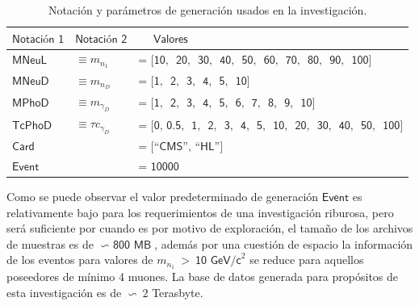\begin{table}[!h]
\centering
\begin{tabular}{|lll|}
\hline
$\textsf{Notación 1}$  & $\textsf{Notación 2}$  & $\textsf{~~~~Valores}$\\
\hline
$\textsf{MNeuL}$    & $\equiv m_{n_1}$  & $\textsf{= [10, ~20, ~30, ~40, ~50, ~60, ~70, ~80, ~90, ~100]}$\\
$\textsf{MNeuD}$    & $\equiv m_{n_D}$  & $\textsf{= [1, ~2, ~3, ~4, ~5, ~10]}$\\
$\textsf{MPhoD}$    & $\equiv m_{\gamma_D}$  & $\textsf{= [1, ~2, ~3, ~4, ~5, ~6, ~7, ~8, ~9, ~10]}$\\
$\textsf{TcPhoD}$   & $\equiv \tau c_{\gamma_D}$  & $\textsf{= [0,~0.5, ~1, ~2, ~3, ~4, ~5, ~10, ~20, ~30, ~40, ~50, ~100]}$\\
$\textsf{Card}$     & & $\textsf{= [``CMS'', ``HL'']}$ \\
$\textsf{Event}$    & & $\textsf{= 10000}$ \\
\hline
\end{tabular}%
\caption{Notación y parámetros de generación usados en la investigación.}
\label{parametros_generacion}
\end{table}

Como se puede observar el valor predeterminado de generación $\textsf{Event}$ es relativamente bajo para los requerimientos de una investigación riburosa, pero será suficiente por cuando es por motivo de exploración, el tamaño de los archivos de muestras es de $\backsim\textsf{ 800 MB}$, además por una cuestión de espacio la información de los eventos para valores de $m_{n_1}~>~\textsf{10 GeV/c}^2$ %
se reduce para aquellos poseedores de mínimo 4 muones. La base de datos generada para propósitos de esta investigación es de $\backsim ~2$ Terasbyte.

